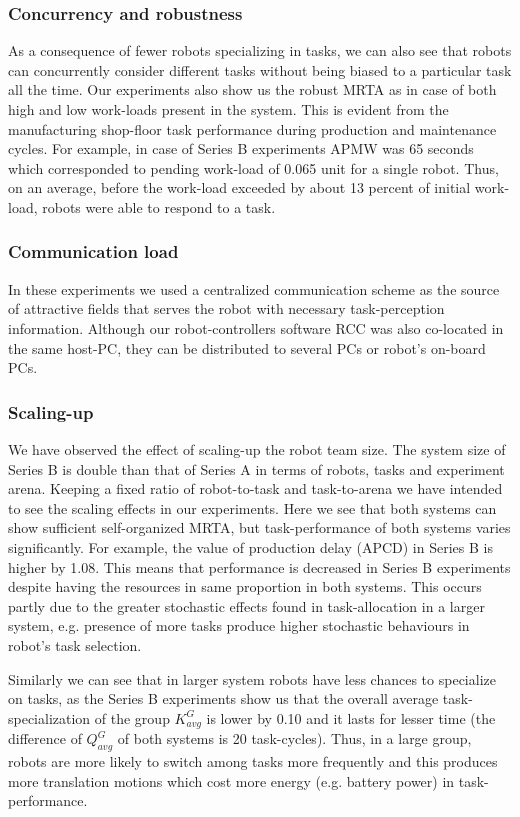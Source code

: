 \documentclass[smallcondensed]{svjour3}
\begin{document}
\subsubsection{Concurrency and robustness}
As a consequence of fewer robots specializing in tasks, we can also see that robots can concurrently  consider different tasks without being biased to a particular task all the time. Our experiments also show us the robust MRTA as in case of  both high and low work-loads present in the system. This is evident from the manufacturing shop-floor task performance during production and maintenance cycles. For example,  in case of Series B experiments APMW was 65 seconds which corresponded  to pending work-load of 0.065 unit for a single robot. Thus, on an average, before the work-load exceeded by about 13 percent of initial work-load, robots were able to respond to  a task.
\subsubsection{Communication load} 
In these experiments we used a centralized communication scheme as the source of attractive fields that serves the robot with necessary task-perception information. Although our robot-controllers software RCC was also co-located in the same host-PC, they can be distributed to several PCs or robot's on-board PCs.
\subsubsection{Scaling-up}
We have observed the effect of scaling-up the robot team size. The system size of Series B is double than that of Series A in terms of robots, tasks and experiment arena. Keeping a fixed ratio of robot-to-task and task-to-arena we have intended to see the scaling effects in our experiments. Here we see that both systems can show sufficient self-organized MRTA, but task-performance of both systems varies significantly. For example, the value of production delay (APCD) in Series B is higher by 1.08. This means that performance  is decreased in Series B experiments despite having the resources in same proportion in both systems. This occurs partly due to the greater stochastic effects found in task-allocation in a larger system, e.g. presence of more tasks produce higher stochastic behaviours in robot's task selection.

Similarly we can see that in larger system robots have less chances to specialize on tasks, as the Series B experiments show us that the overall average task-specialization of the group $K^G_{avg}$ is lower by 0.10 and it lasts for lesser time (the difference of $Q^G_{avg}$  of both systems is 20 task-cycles). Thus, in a large group, robots are more likely to switch among tasks more frequently and this produces more translation motions which cost more energy (e.g. battery power) in task-performance.
\end{document}
